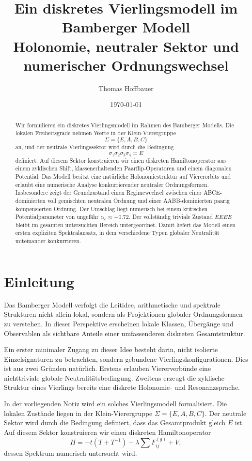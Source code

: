 \documentclass[11pt,a4paper]{article}
\title{Ein diskretes Vierlingsmodell im Bamberger Modell\\
	\large Holonomie, neutraler Sektor und numerischer Ordnungswechsel}
\author{Thomas Hoffbauer}
\date{\today}
\begin{document}
	\maketitle
	
	\begin{abstract}
		Wir formulieren ein diskretes Vierlingsmodell im Rahmen des Bamberger Modells. Die lokalen Freiheitsgrade nehmen Werte in der Klein-Vierergruppe
		\[
		\Sigma=\{E,A,B,C\}
		\]
		an, und der neutrale Vierlingssektor wird durch die Bedingung
		\[
		\sigma_1\sigma_2\sigma_3\sigma_4=E
		\]
		definiert. Auf diesem Sektor konstruieren wir einen diskreten Hamiltonoperator aus einem zyklischen Shift, klassenerhaltenden Paarflip-Operatoren und einem diagonalen Potential. Das Modell besitzt eine natürliche Holonomiestruktur auf Viererorbits und erlaubt eine numerische Analyse konkurrierender neutraler Ordnungsformen. Insbesondere zeigt der Grundzustand einen Regimewechsel zwischen einer ABCE-dominierten voll gemischten neutralen Ordnung und einer AABB-dominierten paarig kompensierten Ordnung. Der Umschlag liegt numerisch bei einem kritischen Potentialparameter von ungefähr \(\alpha_c\approx -0.72\). Der vollständig triviale Zustand \(EEEE\) bleibt im gesamten untersuchten Bereich untergeordnet. Damit liefert das Modell einen ersten expliziten Spektralansatz, in dem verschiedene Typen globaler Neutralität miteinander konkurrieren.
	\end{abstract}
	
	\tableofcontents
	
	\section{Einleitung}
	
	Das Bamberger Modell verfolgt die Leitidee, arithmetische und spektrale Strukturen nicht allein lokal, sondern als Projektionen globaler Ordnungsformen zu verstehen. In dieser Perspektive erscheinen lokale Klassen, Übergänge und Observablen als sichtbare Anteile einer umfassenderen diskreten Gesamtstruktur.
	
	Ein erster minimaler Zugang zu dieser Idee besteht darin, nicht isolierte Einzelsignaturen zu betrachten, sondern gebundene Vierlingskonfigurationen. Dies ist aus zwei Gründen natürlich. Erstens erlauben Viererverbünde eine nichttriviale globale Neutralitätsbedingung. Zweitens erzeugt die zyklische Struktur eines Vierlings bereits eine diskrete Holonomie- und Resonanzsprache.
	
	In der vorliegenden Notiz wird ein solches Vierlingsmodell formalisiert. Die lokalen Zustände liegen in der Klein-Vierergruppe \(\Sigma=\{E,A,B,C\}\). Der neutrale Sektor wird durch die Bedingung definiert, dass das Gesamtprodukt gleich \(E\) ist. Auf diesem Sektor konstruieren wir einen diskreten Hamiltonoperator
	\[
	H=-t(T+T^{-1})-\lambda\sum F_{ij}^{(g)}+V,
	\]
	dessen Spektrum numerisch untersucht wird.
	
\end{document}
